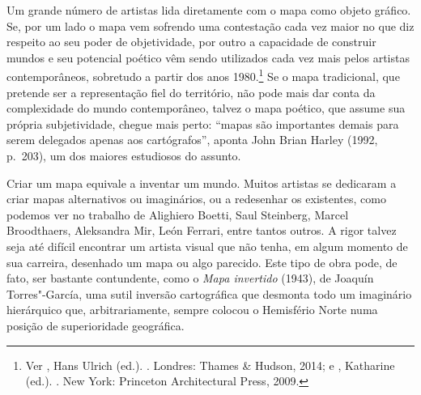 Um grande número de artistas lida diretamente com o mapa como objeto
gráfico. Se, por um lado o mapa vem sofrendo uma contestação cada vez
maior no que diz respeito ao seu poder de objetividade, por outro a
capacidade de construir mundos e seu potencial poético vêm sendo
utilizados cada vez mais pelos artistas contemporâneos, sobretudo a
partir dos anos 1980.\footnote{Ver , Hans Ulrich
  (ed.). {}. Londres: Thames \& Hudson, 2014; e , Katharine
  (ed.). {}. New York: Princeton Architectural Press, 2009.} Se o mapa
tradicional, que pretende ser a representação fiel do território, não
pode mais dar conta da complexidade do mundo contemporâneo, talvez o
mapa poético, que assume sua própria subjetividade, chegue mais perto:
``mapas são importantes demais para serem delegados apenas aos
cartógrafos'', aponta John Brian Harley (1992, p.~203), um dos maiores
estudiosos do assunto.

Criar um mapa equivale a inventar um mundo. Muitos artistas se dedicaram
a criar mapas alternativos ou imaginários, ou a redesenhar os
existentes, como podemos ver no trabalho de Alighiero Boetti, Saul
Steinberg, Marcel Broodthaers, Aleksandra Mir, León Ferrari, entre
tantos outros. A rigor talvez seja até difícil encontrar um artista
visual que não tenha, em algum momento de sua carreira, desenhado um
mapa ou algo parecido. Este tipo de obra pode, de fato, ser bastante
contundente, como o \emph{Mapa invertido} (1943), de Joaquín
Torres"-García, uma sutil inversão cartográfica que desmonta todo um
imaginário hierárquico que, arbitrariamente, sempre colocou o Hemisfério
Norte numa posição de superioridade geográfica.

